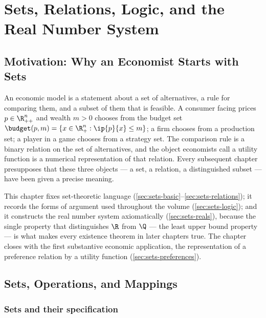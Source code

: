 
\chapter{Sets, Relations, Logic, and the Real Number System}\label{ch:sets}

\section{Motivation: Why an Economist Starts with Sets}\label{sec:sets-motivation}

An economic model is a statement about a set of alternatives, a rule for
comparing them, and a subset of them that is feasible. A consumer facing prices
$p\in\R^n_{++}$ and wealth $m>0$ chooses from the budget set
$\budget(p,m)=\{x\in\R^n_+ : \ip{p}{x}\leq m\}$; a firm chooses from a production
set; a player in a game chooses from a strategy set. The comparison rule is a
binary relation on the set of alternatives, and the object economists call a
utility function is a numerical representation of that relation. Every
subsequent chapter presupposes that these three objects --- a set, a relation, a
distinguished subset --- have been given a precise meaning.

This chapter fixes set-theoretic language
(\autoref{sec:sets-basic}--\autoref{sec:sets-relations}); it records the forms of
argument used throughout the volume (\autoref{sec:sets-logic}); and it
constructs the real number system axiomatically
(\autoref{sec:sets-reals}), because the single property that distinguishes $\R$
from $\Q$ --- the least upper bound property --- is what makes every existence
theorem in later chapters true. The chapter closes with the first substantive
economic application, the representation of a preference relation by a utility
function (\autoref{sec:sets-preferences}).

\section{Sets, Operations, and Mappings}\label{sec:sets-basic}

\subsection{Sets and their specification}

